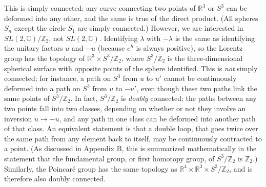 This is simply connected: any curve connecting two points of $\mathbb{R}^3$ or $S^3$ can
be deformed into any other, and the same is true of the direct product. (All
spheres $S_n$ except the circle $S_1$ are simply connected.) However, we are
interested in $SL(2,\mathbb{C})/\mathbb{Z}_2$, not $SL(2,\mathbb{C})$. Identifying $\lambda$ with
$-\lambda$ is the same as identifying the unitary factors $u$ and $-u$ (because
$e^h$ is always positive), so the Lorentz group has the topology of
$\mathbb{R}^3\times S^3/\mathbb{Z}_2$, where $S^3/\mathbb{Z}_2$ is the three-dimensional spherical surface
with opposite points of the sphere identified. This is \emph{not} simply
connected; for instance, a path on $S^3$ from $u$ to $u'$ cannot be continuously
deformed into a path on $S^3$ from $u$ to $-u'$, even though these two paths
link the same points of $S^3/\mathbb{Z}_2$. In fact, $S^3/\mathbb{Z}_2$ is \emph{doubly}
connected; the paths between any two points fall into two classes, depending on
whether or not they involve an inversion $u\to-u$, and any path in one class
can be deformed into another path of that class. An equivalent statement is
that a double loop, that goes twice over the same path from any element back to
itself, may be continuously contracted to a point. (As discussed in Appendix B,
this is summarized mathematically in the statement that the fundamental group,
or first homotopy group, of $S^3/\mathbb{Z}_2$ is $\mathbb{Z}_2$.) Similarly, the
Poincar\'e group has the same topology as $\mathbb{R}^4 \times \mathbb{R}^3 \times S^3/\mathbb{Z}_2$, and is
therefore also doubly connected.

